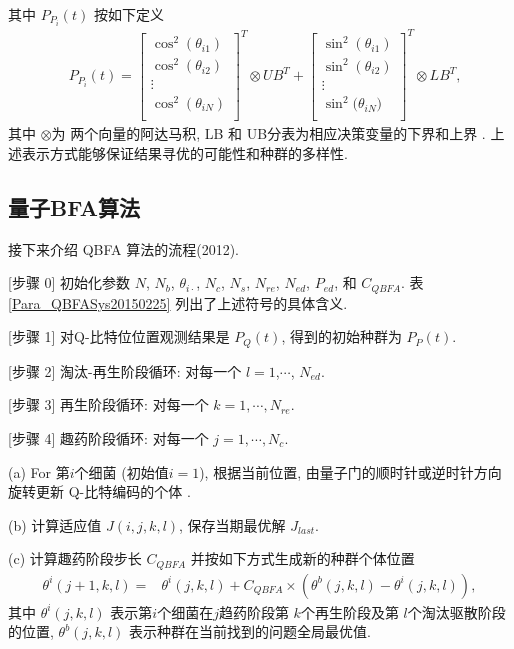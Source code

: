 其中 $P_{P_i}(t)$ 按如下定义
\begin{align*}
&P_{P_i}(t)=
\left [
\begin{array}{cccc}
\cos^2(\theta_{i1})\\ \cos^2(\theta_{i2})\\ \vdots\\ \cos^2(\theta_{iN})\\
\end{array}
\right]^T\otimes UB^T
+\left [
\begin{array}{cccc}
\sin^2(\theta_{i1})\\ \sin^2(\theta_{i2})\\ \vdots\\ \sin^2(\theta_{iN} \big)\\
\end{array}
\right]^T\otimes LB^T,
\end{align*}
其中 $\otimes$为 两个向量的阿达马积, LB 和 UB分表为相应决策变量的下界和上界 . 上述表示方式能够保证结果寻优的可能性和种群的多样性.
\subsection{量子BFA算法}
接下来介绍 QBFA 算法的流程(2012).

[步骤 0] 初始化参数 $N$, $N_b$, $\theta_{i\cdot}$, $N_c$, $N_s$, $N_{re}$, $N_{ed}$, $P_{ed}$, 和 $C_{QBFA}$.
表 \ref{Para_QBFASys20150225} 列出了上述符号的具体含义.

[步骤 1] 对Q-比特位位置观测结果是 $P_Q (t)$, 得到的初始种群为 $P_P(t)$.

[步骤 2] 淘汰-再生阶段循环: 对每一个 $l=1$,$\cdots$, $N_{ed}$.

[步骤 3] 再生阶段循环: 对每一个 $k=1,\cdots,N_{re}$.

[步骤 4] 趣药阶段循环:  对每一个 $j=1,\cdots,N_{c}$.

\quad\quad (a) \textcolor[rgb]{0,0,1}{For} 第$i$个细菌 (初始值$i=1$), 根据当前位置, 由量子门的顺时针或逆时针方向旋转更新 Q-比特编码的个体 .

\quad\quad (b) 计算适应值 $J(i,j,k,l)$, 保存当期最优解 $J_{last}$.

\quad\quad (c) 计算趣药阶段步长 $C_{QBFA}$ 并按如下方式生成新的种群个体位置
\begin{align}
    \theta^i(j+1,k,l)=&\theta^i(j,k,l)+C_{QBFA} \times(\theta^b(j,k,l)-\theta^i(j,k,l)),
\end{align}
其中 $\theta^i(j,k,l)$ 表示第$i$个细菌在$j$趋药阶段第 $k$个再生阶段及第 $l$个淘汰驱散阶段 的位置, $\theta^b(j,k,l)$ 表示种群在当前找到的问题全局最优值.

